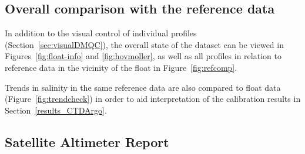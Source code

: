 \documentclass{article}
\begin{document}
\newpage
\subsection{Overall comparison with the reference data}
In addition to the visual control of individual profiles
(Section~\ref{sec:visualDMQC}), the overall state of the dataset can be
viewed in Figures~\ref{fig:float-info} and \ref{fig:hovmoller}, as well as
all profiles in relation to reference data in the vicinity of the float in
Figure~\ref{fig:refcomp}.

Trends in salinity in the same reference data are also compared to float
data (Figure~\ref{fig:trendcheck}) in order to aid interpretation of the
calibration results in Section~\ref{results_CTDArgo}.

\begin{figure}[H] 
\end{figure}
%
\begin{figure}[H] 
\end{figure}

 

\newpage
\subsection{Satellite Altimeter Report}

      
\newpage
\end{document}
